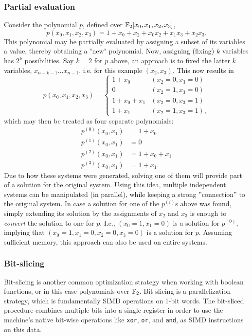 \subsubsection{Partial evaluation} \label{sec:prereq:partial_eval}
Consider the polynomial $p$, defined over $\mathbb{F}_2[x_0,x_1,x_2,x_3]$,
$$
    p(x_0, x_1, x_2, x_3) = 1 + x_0 + x_2 + x_0x_2 + x_1x_3 + x_2x_3.
$$
This polynomial may be partially evaluated by assigning a subset of its variables a value, thereby obtaining a "new" polynomial. Now, assigning (fixing) $k$ variables has $2^k$ possibilities. Say $k = 2$ for $p$ above, an approach is to fixed the latter $k$ variables, $x_{n - k - 1} \dots x_{n - 1}$, i.e. for this example $(x_2,x_3)$. This now results in 
\begin{equation}
    p(x_0,x_1,x_2,x_3) = 
    \begin{cases}
        1 + x_0       & (x_2 = 0, x_3 = 0)\\
        0             & (x_2 = 1, x_3 = 0)\\
        1 + x_0 + x_1 & (x_2 = 0, x_3 = 1)\\
        1 + x_1       & (x_2 = 1, x_3 = 1),
    \end{cases}
\end{equation} 
which may then be treated as four separate polynomials:
\begin{equation*}
    \begin{split}
        p^{(0)}(x_0, x_1) &= 1 + x_0          \\
        p^{(1)}(x_0, x_1) &= 0                \\           
        p^{(2)}(x_0, x_1) &= 1 + x_0 + x_1    \\
        p^{(3)}(x_0, x_1) &= 1 + x_1.
    \end{split}
\end{equation*}
Due to how these systems were generated, solving one of them will provide part of a solution for the original system. Using this idea, multiple independent systems can be manipulated (in parallel), while keeping a strong ''connection'' to the original system. In case a solution for one of the $p^{(i)}$s above was found, simply extending its solution by the assignments of $x_2$ and $x_3$ is enough to \textit{convert} the solution to one for $p$. I.e., $(x_0 = 1, x_1 = 0)$ is a solution for $p^{(0)}$, implying that $(x_0 = 1, x_1 = 0, x_2 = 0, x_3 = 0)$ is a solution for $p$. Assuming sufficient memory, this approach can also be used on entire systems.

\subsubsection{Bit-slicing}
Bit-slicing is another common optimization strategy when working with boolean functions, or in this case polynomials over $\mathbb{F}_2$. Bit-slicing is a parallelization strategy, which is fundamentally SIMD operations on 1-bit words. The bit-sliced procedure combines multiple bits into a single register in order to use the machine's native bit-wise operations like \texttt{xor}, \texttt{or}, and \texttt{and}, as SIMD instructions on this data.

